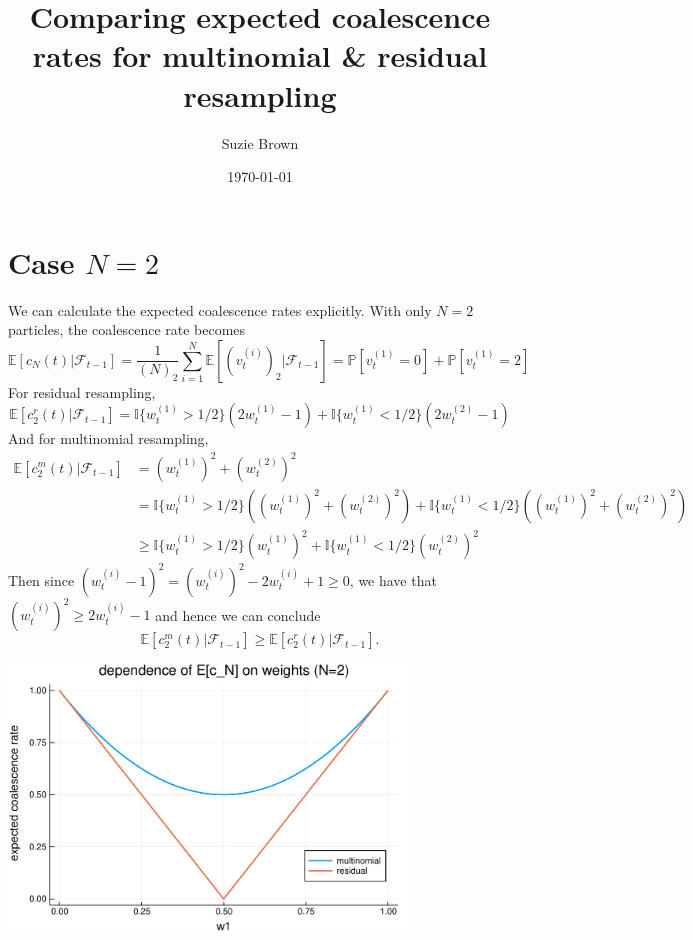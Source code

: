 \documentclass[fleqn]{article}
\title{Comparing expected coalescence rates for multinomial \& residual resampling}
\author{Suzie Brown}
\date{\today}
\theoremstyle{definition}
\newcommand{\PR}{\mathbb{P}}
\newcommand{\E}{\mathbb{E}}
\newcommand{\I}[1]{\mathbb{I}\{#1\}}
\newcommand{\F}{\mathcal{F}_{t-1}}
\newcommand{\vt}[2][t]{v_{#1}^{(#2)}}
\newcommand{\wt}[2][t]{w_{#1}^{(#2)}}
\begin{document}
\maketitle
\thispagestyle{fancy}

\section*{Case $N=2$}
We can calculate the expected coalescence rates explicitly. With only $N=2$ particles, the coalescence rate becomes
\begin{equation*}
\E[c_N(t) |\F] = \frac{1}{(N)_2} \sum_{i=1}^{N} \E\left[ (\vt{i})_2 |\F \right] 
= \PR[\vt{1} = 0] + \PR[\vt{1} = 2]
\end{equation*}
For residual resampling,
\begin{equation*}
\E[c_2^r(t) |\F] = \I{\wt{1} > 1/2} (2\wt{1} -1) + \I{\wt{1} < 1/2} (2\wt{2} -1)
\end{equation*}
And for multinomial resampling,
\begin{align*}
\E[c_2^m(t) |\F] &= (\wt{1})^2 + (\wt{2})^2 \\
&= \I{\wt{1} > 1/2} ((\wt{1})^2 + (\wt{2})^2) + \I{\wt{1} < 1/2} ((\wt{1})^2 + (\wt{2})^2) \\
&\geq  \I{\wt{1} > 1/2} (\wt{1})^2 + \I{\wt{1} < 1/2} (\wt{2})^2
\end{align*}
Then since $(\wt{i} -1)^2 = (\wt{i})^2 -2\wt{i} +1 \geq 0$, we have that $(\wt{i})^2 \geq 2\wt{i} -1$ and hence we can conclude
\begin{equation*}
\E[c_2^m(t) |\F] \geq \E[c_2^r(t) |\F].
\end{equation*}

\centering
\includegraphics[width=0.8\textwidth]{EcN_mn_res_N2.pdf}
\end{document}
